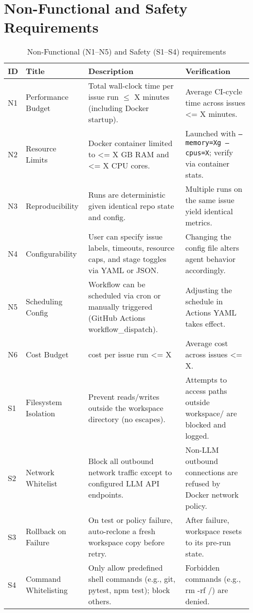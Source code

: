 \section{Non-Functional and Safety Requirements}

\begin{table}[ht]
    \centering
    \small
    \begin{tabular*}{\textwidth}{@{\extracolsep{\fill}} p{1cm} p{3cm} p{5cm} p{4cm} @{}}
        \toprule
        \textbf{ID} & \textbf{Title} & \textbf{Description} & \textbf{Verification} \\
        \midrule
        N1 & Performance Budget
        & Total wall-clock time per issue run $\leq$ X minutes (including Docker startup).
        & Average CI-cycle time across issues <= X minutes. \\[4pt]
        N2 & Resource Limits
        & Docker container limited to <= X GB RAM and <= X CPU cores.
        & Launched with \texttt{--memory=Xg --cpus=X}; verify via container stats. \\[4pt]
        N3 & Reproducibility
        & Runs are deterministic given identical repo state and config.
        & Multiple runs on the same issue yield identical metrics. \\[4pt]
        N4 & Configurability
        & User can specify issue labels, timeouts, resource caps, and stage toggles via YAML or JSON.
        & Changing the config file alters agent behavior accordingly. \\[4pt]
        N5 & Scheduling Config
        & Workflow can be scheduled via cron or manually triggered (GitHub Actions workflow\_dispatch).
        & Adjusting the schedule in Actions YAML takes effect. \\[4pt]
        N6 & Cost Budget
        & cost per issue run <= X
        & Average cost across issues <= X. \\[4pt]
        \midrule
        S1 & Filesystem Isolation
        & Prevent reads/writes outside the workspace directory (no escapes).
        & Attempts to access paths outside workspace/ are blocked and logged. \\[4pt]
        S2 & Network Whitelist
        & Block all outbound network traffic except to configured LLM API endpoints.
        & Non-LLM outbound connections are refused by Docker network policy. \\[4pt]
        S3 & Rollback on Failure
        & On test or policy failure, auto-reclone a fresh workspace copy before retry.
        & After failure, workspace resets to its pre-run state. \\[4pt]
        S4 & Command Whitelisting
        & Only allow predefined shell commands (e.g., git, pytest, npm test); block others.
        & Forbidden commands (e.g., rm -rf /) are denied. \\
        \bottomrule
    \end{tabular*}
    \caption{Non-Functional (N1--N5) and Safety (S1--S4) requirements}
\end{table}

